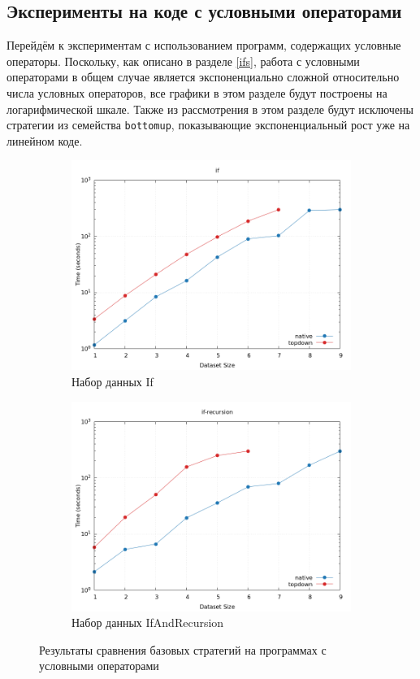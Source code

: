 \documentclass[../thesis.tex]{subfiles}
\begin{document}
\subsection{Эксперименты на коде с условными операторами}\label{if_experiments}

Перейдём к экспериментам с использованием программ, содержащих условные операторы. Поскольку, как описано в разделе \ref{ifs}, работа с условными операторами в общем случае является экспоненциально сложной относительно числа условных операторов, все графики в этом разделе будут построены на логарифмической шкале. Также из рассмотрения в этом разделе будут исключены стратегии из семейства \texttt{bottomup}, показывающие экспоненциальный рост уже на линейном коде.

\begin{figure}[h]
    \begin{subfigure}{0.5\textwidth}
    \includegraphics[width=\linewidth]{basic_if.png} 
    \caption{Набор данных If}
    \end{subfigure}
    \begin{subfigure}{0.5\textwidth}
    \includegraphics[width=\linewidth]{basic_ifrec.png}
    \caption{Набор данных IfAndRecursion}
    \end{subfigure}
    \caption{Результаты сравнения базовых стратегий на программах с условными операторами}
    \label{basic_ifs}
\end{figure}
\end{document}
